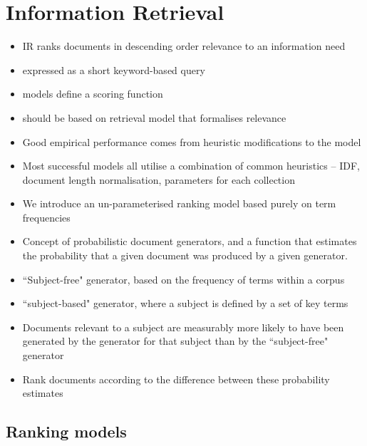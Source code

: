 \chapter{Information Retrieval}\label{ch:information_retrieval}
%
\begin{itemize}
\item IR ranks documents in descending order relevance to an information need
\item expressed as a short keyword-based query~\cite{robertson:1997}
\item models define a scoring function
\item should be based on retrieval model that formalises relevance
\item Good empirical performance comes from heuristic modifications to the model
\item Most successful models all utilise a combination of common heuristics -- IDF, document length normalisation, parameters for each collection
\item We introduce an un-parameterised ranking model based purely on term frequencies
\item Concept of probabilistic document generators, and a function that estimates the probability that a given document was produced by a given generator. 
\item ``Subject-free" generator, based on the frequency of terms within a corpus
\item ``subject-based" generator, where a subject is defined by a set of key terms
\item Documents relevant to a subject are measurably more likely to have been generated by the generator for that subject than by the ``subject-free" generator
\item Rank documents according to the difference between these probability  estimates
\end{itemize}
 
\section{Ranking models}

